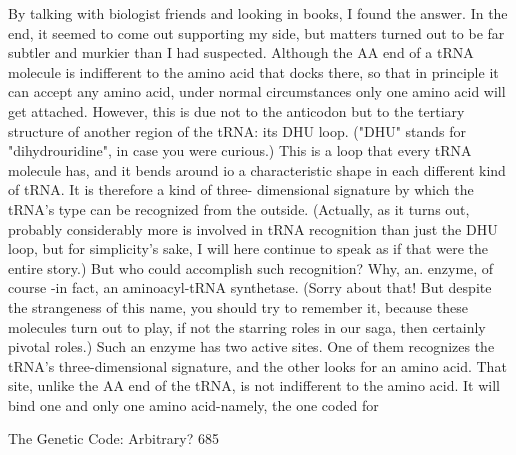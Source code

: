         By talking with biologist friends and looking in books, I found the answer. In
the end, it seemed to come out supporting my side, but matters turned out to be far
subtler and murkier than I had suspected. Although the AA end of a tRNA molecule is
indifferent to the amino acid that docks there, so that in principle it can accept any
amino acid, under normal circumstances only one amino acid will get attached.
However, this is due not to the anticodon but to the tertiary structure of another region
of the tRNA: its DHU loop. ("DHU" stands for "dihydrouridine", in case you were
curious.) This is a loop that every tRNA molecule has, and it bends around io a
characteristic shape in each different kind of tRNA. It is therefore a kind of three-
dimensional signature by which the tRNA's type can be recognized from the outside.
(Actually, as it turns out, probably considerably more is involved in tRNA recognition
than just the DHU loop, but for simplicity's sake, I will here continue to speak as if
that were the entire story.)
        But who could accomplish such recognition? Why, an. enzyme, of course -in
fact, an aminoacyl-tRNA synthetase. (Sorry about that! But despite the strangeness of
this name, you should try to remember it, because these molecules turn out to play, if
not the starring roles in our saga, then certainly pivotal roles.) Such an enzyme has
two active sites. One of them recognizes the tRNA's three-dimensional signature, and
the other looks for an amino acid. That site, unlike the AA end of the tRNA, is not
indifferent to the amino acid. It will bind one and only one amino acid-namely, the
one coded for




The Genetic Code: Arbitrary?                                                         685

